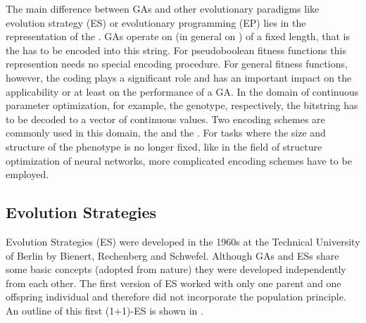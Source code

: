 The main difference between GAs and other evolutionary
paradigms like evolution strategy (ES) or evolutionary programming
(EP) lies in the representation of the \emph{}. GAs
operate on  (in general on )
of a fixed length, that is the \emph{} has to be
encoded into this string.  For pseudoboolean fitness functions this
represention needs no special encoding procedure. For general fitness
functions, however, the coding plays a significant role and has an
important impact on the applicability or at least on the performance
of a GA.  In the domain of continuous parameter optimization,
for example, the genotype, respectively, the bitstring has to be
decoded to a vector of continuous values.  Two encoding schemes are
commonly used in this domain, the  and the
.  For tasks where the size and structure of the
phenotype is no longer fixed, like in the field of structure
optimization of neural networks, more complicated encoding schemes
have to be employed.


	\subsection{Evolution Strategies}
	\label{evoalg:subs:evolutionStrategies}

Evolution Strategies (ES) were developed in the 1960s at the
Technical University of Berlin by Bienert, Rechenberg and Schwefel.
Although GAs and ESs share some basic concepts (adopted from nature)
they were developed independently from each other.  The first version
of ES worked with only one parent and one offspring individual and
therefore did not incorporate the population principle.  An outline of
this first (1+1)-ES is shown in .

